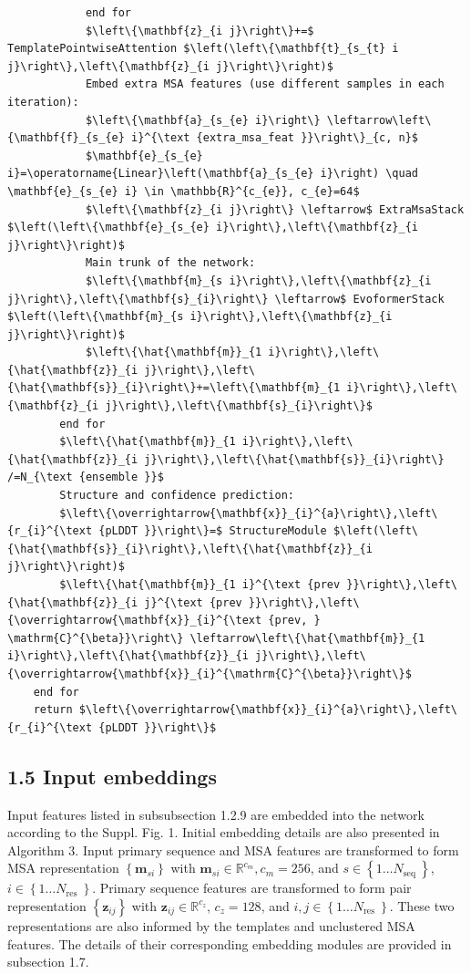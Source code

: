 \documentclass[10pt]{article}
\begin{document}
\begin{verbatim}
            end for
            $\left\{\mathbf{z}_{i j}\right\}+=$ TemplatePointwiseAttention $\left(\left\{\mathbf{t}_{s_{t} i j}\right\},\left\{\mathbf{z}_{i j}\right\}\right)$
            Embed extra MSA features (use different samples in each iteration):
            $\left\{\mathbf{a}_{s_{e} i}\right\} \leftarrow\left\{\mathbf{f}_{s_{e} i}^{\text {extra_msa_feat }}\right\}_{c, n}$
            $\mathbf{e}_{s_{e} i}=\operatorname{Linear}\left(\mathbf{a}_{s_{e} i}\right) \quad \mathbf{e}_{s_{e} i} \in \mathbb{R}^{c_{e}}, c_{e}=64$
            $\left\{\mathbf{z}_{i j}\right\} \leftarrow$ ExtraMsaStack $\left(\left\{\mathbf{e}_{s_{e} i}\right\},\left\{\mathbf{z}_{i j}\right\}\right)$
            Main trunk of the network:
            $\left\{\mathbf{m}_{s i}\right\},\left\{\mathbf{z}_{i j}\right\},\left\{\mathbf{s}_{i}\right\} \leftarrow$ EvoformerStack $\left(\left\{\mathbf{m}_{s i}\right\},\left\{\mathbf{z}_{i j}\right\}\right)$
            $\left\{\hat{\mathbf{m}}_{1 i}\right\},\left\{\hat{\mathbf{z}}_{i j}\right\},\left\{\hat{\mathbf{s}}_{i}\right\}+=\left\{\mathbf{m}_{1 i}\right\},\left\{\mathbf{z}_{i j}\right\},\left\{\mathbf{s}_{i}\right\}$
        end for
        $\left\{\hat{\mathbf{m}}_{1 i}\right\},\left\{\hat{\mathbf{z}}_{i j}\right\},\left\{\hat{\mathbf{s}}_{i}\right\} /=N_{\text {ensemble }}$
        Structure and confidence prediction:
        $\left\{\overrightarrow{\mathbf{x}}_{i}^{a}\right\},\left\{r_{i}^{\text {pLDDT }}\right\}=$ StructureModule $\left(\left\{\hat{\mathbf{s}}_{i}\right\},\left\{\hat{\mathbf{z}}_{i j}\right\}\right)$
        $\left\{\hat{\mathbf{m}}_{1 i}^{\text {prev }}\right\},\left\{\hat{\mathbf{z}}_{i j}^{\text {prev }}\right\},\left\{\overrightarrow{\mathbf{x}}_{i}^{\text {prev, } \mathrm{C}^{\beta}}\right\} \leftarrow\left\{\hat{\mathbf{m}}_{1 i}\right\},\left\{\hat{\mathbf{z}}_{i j}\right\},\left\{\overrightarrow{\mathbf{x}}_{i}^{\mathrm{C}^{\beta}}\right\}$
    end for
    return $\left\{\overrightarrow{\mathbf{x}}_{i}^{a}\right\},\left\{r_{i}^{\text {pLDDT }}\right\}$
\end{verbatim}

\subsection*{1.5 Input embeddings}
Input features listed in subsubsection 1.2.9 are embedded into the network according to the Suppl. Fig. 1. Initial embedding details are also presented in Algorithm 3. Input primary sequence and MSA features are transformed to form MSA representation $\left\{\mathbf{m}_{s i}\right\}$ with $\mathbf{m}_{s i} \in \mathbb{R}^{c_{m}}, c_{m}=256$, and $s \in\left\{1 \ldots N_{\text {seq }}\right\}$, $i \in\left\{1 \ldots N_{\text {res }}\right\}$. Primary sequence features are transformed to form pair representation $\left\{\mathbf{z}_{i j}\right\}$ with $\mathbf{z}_{i j} \in \mathbb{R}^{c_{z}}$, $c_{z}=128$, and $i, j \in\left\{1 \ldots N_{\text {res }}\right\}$. These two representations are also informed by the templates and unclustered MSA features. The details of their corresponding embedding modules are provided in subsection 1.7.
\end{document}
